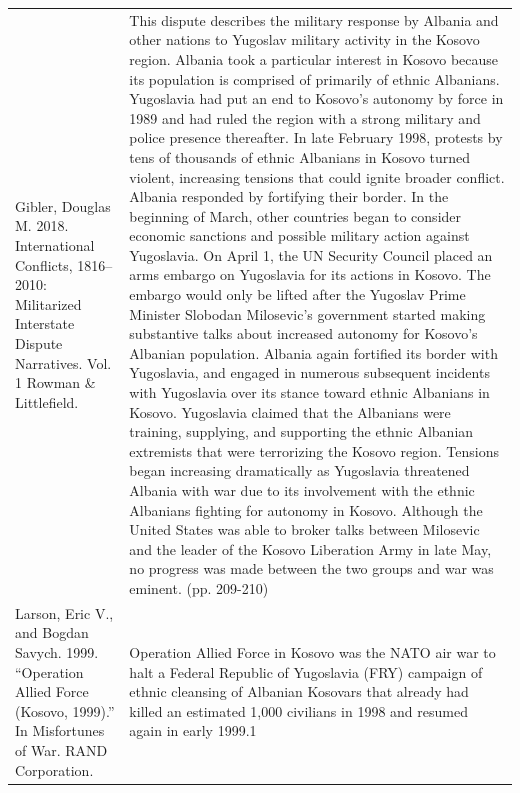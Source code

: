 {\begin{longtable}{p{}p{}}
Gibler, Douglas M. 2018. International Conflicts, 1816–2010: Militarized Interstate Dispute Narratives. Vol. 1 Rowman \& Littlefield. & This dispute describes the military response by Albania and other nations to Yugoslav military activity in the Kosovo region. Albania took a particular interest in Kosovo because its population is comprised of primarily of ethnic Albanians. Yugoslavia had put an end to Kosovo's autonomy by force in 1989 and had ruled the region with a strong military and police presence thereafter. In late February 1998, protests by tens of thousands of ethnic Albanians in Kosovo turned violent, increasing tensions that could ignite broader conflict. Albania responded by fortifying their border. In the beginning of March, other countries began to consider economic sanctions and possible military action against Yugoslavia. On April 1, the UN Security Council placed an arms embargo on Yugoslavia for its actions in Kosovo. The embargo would only be lifted after the Yugoslav Prime Minister Slobodan Milosevic's government started making substantive talks about increased autonomy for Kosovo's Albanian population. Albania again fortified its border with Yugoslavia, and engaged in numerous subsequent incidents with Yugoslavia over its stance toward ethnic Albanians in Kosovo. Yugoslavia claimed that the Albanians were training, supplying, and supporting the ethnic Albanian extremists that were terrorizing the Kosovo region. Tensions began increasing dramatically as Yugoslavia threatened Albania with war due to its involvement with the ethnic Albanians fighting for autonomy in Kosovo. Although the United States was able to broker talks between Milosevic and the leader of the Kosovo Liberation Army in late May, no progress was made between the two groups and war was eminent. (pp. 209-210)
\\
Larson, Eric V., and Bogdan Savych. 1999. “Operation Allied Force (Kosovo, 1999).” In Misfortunes of War. RAND Corporation. & Operation Allied Force in Kosovo was the NATO air war to halt a Federal Republic of Yugoslavia (FRY) campaign of ethnic cleansing of Albanian Kosovars that already had killed an estimated 1,000 civilians in 1998 and resumed again in early 1999.1
\\

\end{longtable}}
